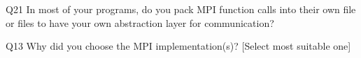 \begin{description}%
\item{Q21} In most of your programs, do you pack MPI function calls into their own file or files to have your own abstraction layer for communication?%
\item{Q13} Why did you choose the MPI implementation(s)? [Select most suitable one]%
\end{description}%
